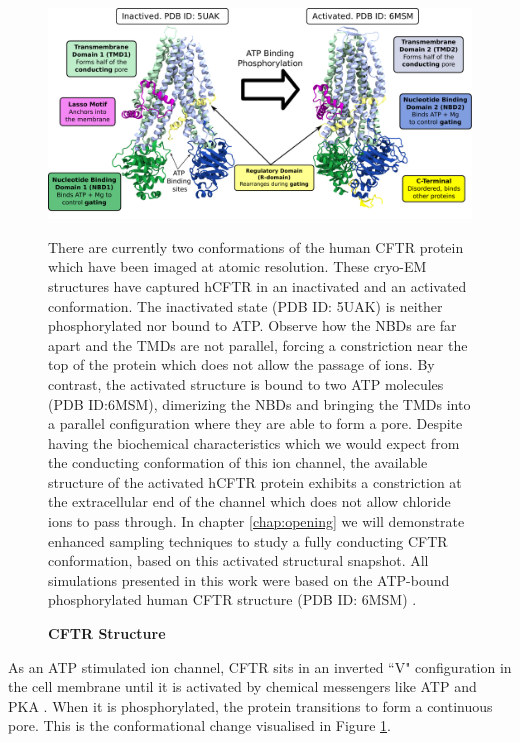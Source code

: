 \begin{figure}
	\begin{center}
	\includegraphics[width=\textwidth]{figures/CFTR_structure.pdf}
	\end{center}
	\captionsetup{singlelinecheck = false, justification=raggedright}
	\caption[CFTR Structure] {\textbf{CFTR Structure}}{There are currently two conformations of the human CFTR protein which have been imaged at atomic resolution. These cryo-EM structures have captured hCFTR in an inactivated and an activated conformation. The inactivated state (PDB ID: 5UAK) is neither phosphorylated nor bound to ATP. Observe how the NBDs are far apart and the TMDs are not parallel, forcing a constriction near the top of the protein which does not allow the passage of ions. By contrast, the activated structure is bound to two ATP molecules (PDB ID:6MSM), dimerizing the NBDs and bringing the TMDs into a parallel configuration where they are able to form a pore. Despite having the biochemical characteristics which we would expect from the conducting conformation of this ion channel, the available structure of the activated hCFTR protein exhibits a constriction at the extracellular end of the channel which does not allow chloride ions to pass through. In chapter \ref{chap:opening} we will demonstrate enhanced sampling techniques to study a fully conducting CFTR conformation, based on this activated structural snapshot. All simulations presented in this work were based on the ATP-bound phosphorylated human CFTR structure (PDB ID: 6MSM) \cite{zhang2018}.} 
	\label{CFTR_structure_domains}
\end{figure}

As an ATP stimulated ion channel, CFTR sits in an inverted ``V" configuration in the cell membrane until it is activated by chemical messengers like ATP and PKA \cite{zhang2018, gadsby2006, mihalyi2020}. When it is phosphorylated, the protein transitions to form a continuous pore. This is the conformational change visualised in Figure \ref{CFTR_structure_domains}.


